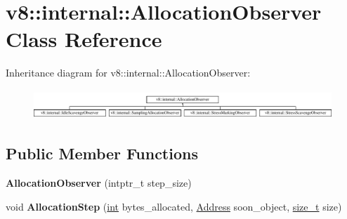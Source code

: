 \hypertarget{classv8_1_1internal_1_1AllocationObserver}{}\section{v8\+:\+:internal\+:\+:Allocation\+Observer Class Reference}
\label{classv8_1_1internal_1_1AllocationObserver}
Inheritance diagram for v8\+:\+:internal\+:\+:Allocation\+Observer\+:\begin{figure}[H]
\begin{center}
\leavevmode
\includegraphics[height=1.124498cm]{classv8_1_1internal_1_1AllocationObserver}
\end{center}
\end{figure}
\subsection*{Public Member Functions}
\begin{DoxyCompactItemize}
\item 
\mbox{\label{classv8_1_1internal_1_1AllocationObserver_afd17faabb89efdf1211915e9e684a31f}} 
{\bfseries Allocation\+Observer} (intptr\+\_\+t step\+\_\+size)
\item 
\mbox{\label{classv8_1_1internal_1_1AllocationObserver_a83b330ab2d41bd63c8463c98e3b44139}} 
void {\bfseries Allocation\+Step} (\mbox{\hyperlink{classint}{int}} bytes\+\_\+allocated, \mbox{\hyperlink{classuintptr__t}{Address}} soon\+\_\+object, \mbox{\hyperlink{classsize__t}{size\+\_\+t}} size)
\end{DoxyCompactItemize}
